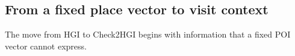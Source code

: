 
\subsection{From a fixed place vector to visit context}

The move from HGI to Check2HGI begins with information that a fixed POI vector cannot
express.

